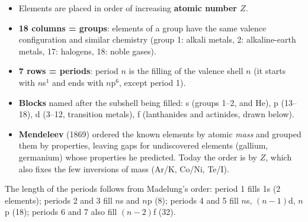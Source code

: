 \begin{itemize}
  \item Elements are placed in order of increasing \textbf{atomic number $Z$}.
  \item \textbf{18 columns = groups}: elements of a group have the same valence configuration and similar
        chemistry (group 1: alkali metals, 2: alkaline-earth metals, 17: halogens, 18: noble gases).
  \item \textbf{7 rows = periods}: period $n$ is the filling of the valence shell $n$ (it starts with
        $n$s$^1$ and ends with $n$p$^6$, except period 1).
  \item \textbf{Blocks} named after the subshell being filled: s (groups 1--2, and He), p (13--18),
        d (3--12, transition metals), f (lanthanides and actinides, drawn below).
  \item \textbf{Mendeleev} (1869) ordered the known elements by atomic \emph{mass} and grouped them by
        properties, leaving gaps for undiscovered elements (gallium, germanium) whose properties he
        predicted. Today the order is by $Z$, which also fixes the few inversions of mass (Ar/K, Co/Ni, Te/I).
\end{itemize}
\begin{center}
\end{center}
The length of the periods follows from Madelung's order: period 1 fills 1s (2 elements); periods 2
and 3 fill $n$s and $n$p (8); periods 4 and 5 fill $n$s, $(n-1)$d, $n$p (18); periods 6 and 7 also
fill $(n-2)$f (32).

